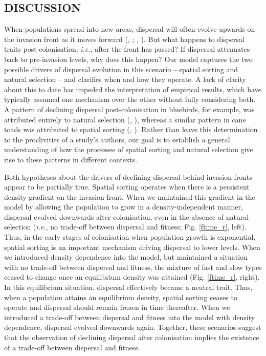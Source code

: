 \documentclass[11pt]{article}
\newcommand{\ie}{{\em i.e.}, }
\newcommand{\CiteP}[1]{(\citeauthor{#1}, \citeyear{#1})}
\newcommand{\Cite}[1]{\citeauthor{#1}, \citeyear{#1}}
\begin{document}
\subsection*{DISCUSSION}

When populations spread into new areas, dispersal will often evolve upwards on the invasion front as it moves forward (\Cite{Travis2002}; \Cite{Phillips2010}). But what happens to dispersal traits post-colonisation; \ie after the front has passed? If dispersal attenuates back to pre-invasion levels, why does this happen? Our model captures the two possible drivers of dispersal evolution in this scenario -- spatial sorting and natural selection -- and clarifies when and how they operate. A lack of clarity about this to date has impeded the interpretation of empirical results, which have typically assumed one mechanism over the other without fully considering both. A pattern of declining dispersal post-colonisation in bluebirds, for example, was attributed entirely to natural selection \CiteP{Duckworth2007}, whereas a similar pattern in cane toads was attributed to spatial sorting \CiteP{Lindstrom2013}. Rather than leave this determination to the proclivities of a study's authors, our goal is to establish a general understanding of how the processes of spatial sorting and natural selection give rise to these patterns in different contexts.

Both hypotheses about the drivers of declining dispersal behind invasion fronts appear to be partially true. Spatial sorting operates when there is a persistent density gradient on the invasion front. When we maintained this gradient in the model by allowing the population to grow in a density-independent manner, dispersal evolved downwards after colonisation, even in the absence of natural selection (\ie no trade-off between dispersal and fitness; Fig. \ref{ftime_r}, left). Thus, in the early stages of colonisation when population growth is exponential, spatial sorting is an important mechanism driving dispersal to lower levels. When we introduced density dependence into the model, but maintained a situation with no trade-off between dispersal and fitness, the mixture of fast and slow types ceased to change once an equilibrium density was attained (Fig. \ref{ftime_r}, right). In this equilibrium situation, dispersal effectively became a neutral trait. Thus, when a population attains an equilibrium density, spatial sorting ceases to operate and dispersal should remain frozen in time thereafter. When we introduced a trade-off between dispersal and fitness into the model with density dependence, dispersal evolved downwards again. Together, these scenarios suggest that the observation of declining dispersal after colonisation implies the existence of a trade-off between dispersal and fitness.
\end{document}

